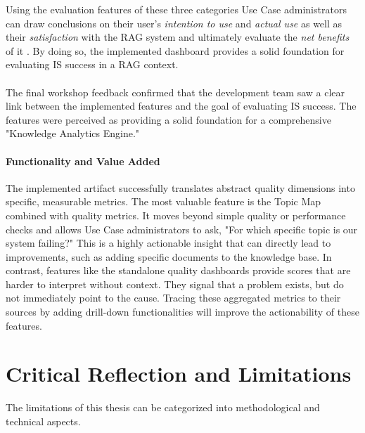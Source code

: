 \documentclass[
	english,
	ruledheaders=section,%
	class=report,%
	thesis={type=bachelor},%
	accentcolor=1b,%
	custommargins=true,%
	marginpar=false,%
	parskip=half-,%
	fontsize=11pt,%
	DIV=14,
]{tudapub}
\begin{document}
Using the evaluation features of these three categories Use Case administrators can draw conclusions on their user's \textit{intention to use} and \textit{actual use}  as well as their \textit{satisfaction} with the RAG system and ultimately evaluate the \textit{net benefits} of it \parencite[p.~24]{DeloneMcLean2003ISSuccessTenYearUpdate}. By doing so, the implemented dashboard provides a solid foundation for evaluating IS success in a RAG context.\\
\\
The final workshop feedback confirmed that the development team saw a clear link between the implemented features and the goal of evaluating IS success. The features were perceived as providing a solid foundation for a comprehensive "Knowledge Analytics Engine."

\paragraph{Functionality and Value Added} The implemented artifact successfully translates abstract quality dimensions into specific, measurable metrics. The most valuable feature is the Topic Map combined with quality metrics. It moves beyond simple quality or performance checks and allows Use Case administrators to ask, "For which specific topic is our system failing?" This is a highly actionable insight that can directly lead to improvements, such as adding specific documents to the knowledge base. In contrast, features like the standalone quality dashboards provide scores that are harder to interpret without context. They signal that a problem exists, but do not immediately point to the cause. Tracing these aggregated metrics to their sources by adding drill-down functionalities will improve the actionability of these features.

\section{Critical Reflection and Limitations}
The limitations of this thesis can be categorized into methodological and technical aspects.
\end{document}
